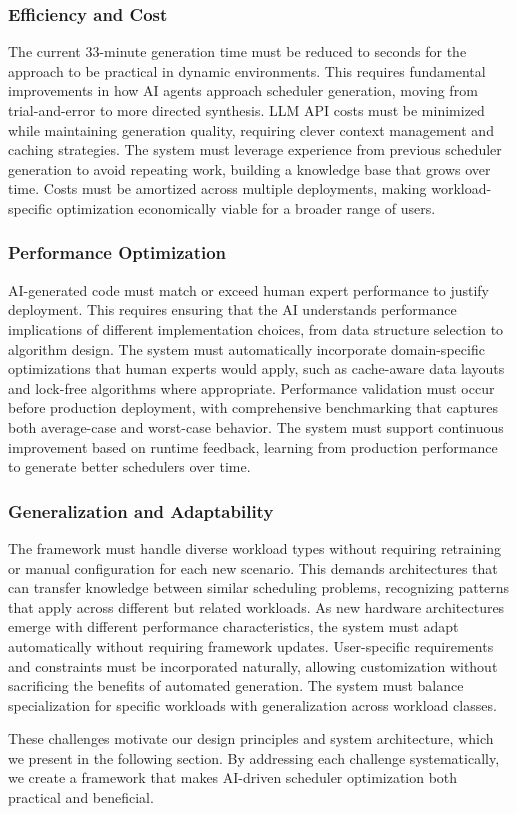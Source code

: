 \subsubsection{Efficiency and Cost}

The current 33-minute generation time must be reduced to seconds for the approach to be practical in dynamic environments. This requires fundamental improvements in how AI agents approach scheduler generation, moving from trial-and-error to more directed synthesis. LLM API costs must be minimized while maintaining generation quality, requiring clever context management and caching strategies. The system must leverage experience from previous scheduler generation to avoid repeating work, building a knowledge base that grows over time. Costs must be amortized across multiple deployments, making workload-specific optimization economically viable for a broader range of users.

\subsubsection{Performance Optimization}

AI-generated code must match or exceed human expert performance to justify deployment. This requires ensuring that the AI understands performance implications of different implementation choices, from data structure selection to algorithm design. The system must automatically incorporate domain-specific optimizations that human experts would apply, such as cache-aware data layouts and lock-free algorithms where appropriate. Performance validation must occur before production deployment, with comprehensive benchmarking that captures both average-case and worst-case behavior. The system must support continuous improvement based on runtime feedback, learning from production performance to generate better schedulers over time.

\subsubsection{Generalization and Adaptability}

The framework must handle diverse workload types without requiring retraining or manual configuration for each new scenario. This demands architectures that can transfer knowledge between similar scheduling problems, recognizing patterns that apply across different but related workloads. As new hardware architectures emerge with different performance characteristics, the system must adapt automatically without requiring framework updates. User-specific requirements and constraints must be incorporated naturally, allowing customization without sacrificing the benefits of automated generation. The system must balance specialization for specific workloads with generalization across workload classes.

These challenges motivate our design principles and system architecture, which we present in the following section. By addressing each challenge systematically, we create a framework that makes AI-driven scheduler optimization both practical and beneficial.